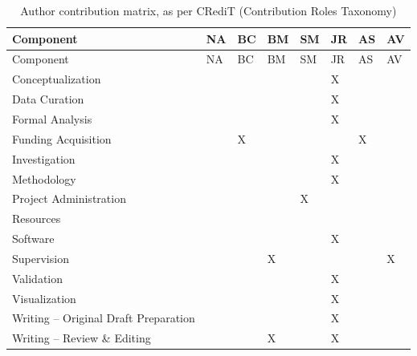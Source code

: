 \documentclass[preprint, 3p,
authoryear]{elsarticle} %
\begin{document}
\begin{longtable}[]{@{}llllllll@{}}
\caption{Author contribution matrix, as per CRediT (Contribution Roles
Taxonomy)}\tabularnewline
\toprule\noalign{}
Component & NA & BC & BM & SM & JR & AS & AV \\
\midrule\noalign{}
\endfirsthead
\toprule\noalign{}
Component & NA & BC & BM & SM & JR & AS & AV \\
\midrule\noalign{}
\endhead
\bottomrule\noalign{}
\endlastfoot
Conceptualization & & & & & X & & \\
Data Curation & & & & & X & & \\
Formal Analysis & & & & & X & & \\
Funding Acquisition & & X & & & & X & \\
Investigation & & & & & X & & \\
Methodology & & & & & X & & \\
Project Administration & & & & X & & & \\
Resources & & & & & & & \\
Software & & & & & X & & \\
Supervision & & & X & & & & X \\
Validation & & & & & X & & \\
Visualization & & & & & X & & \\
Writing -- Original Draft Preparation & & & & & X & & \\
Writing -- Review \& Editing & & & X & & X & & \\
\end{longtable}

\renewcommand\refname{References}

\end{document}

